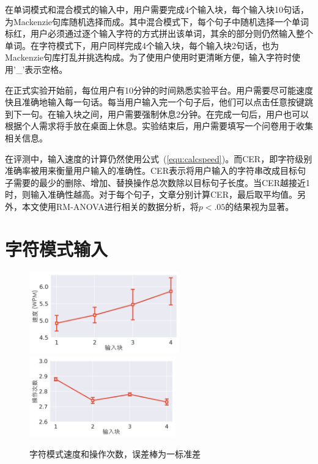 在单词模式和混合模式的输入中，用户需要完成4个输入块，每个输入块10句话，为Mackenzie句库随机选择而成\cite{mackenzie2003phrase}。其中混合模式下，每个句子中随机选择一个单词标红，用户必须通过逐个输入字符的方式拼出该单词，其余的部分则仍然输入整个单词。在字符模式下，用户同样完成4个输入块，每个输入块2句话，也为Mackenzie句库\cite{mackenzie2003phrase}打乱并挑选构成。为了使用户使用时更清晰方便，输入字符时使用'\_'表示空格。

在正式实验开始前，每位用户有10分钟的时间熟悉实验平台。用户需要尽可能速度快且准确地输入每一句话。每当用户输入完一个句子后，他们可以点击任意按键跳到下一句。在输入块之间，用户需要强制休息2分钟。在完成一句后，用户也可以根据个人需求将手放在桌面上休息。实验结束后，用户需要填写一个问卷用于收集相关信息。

在评测中，输入速度的计算仍然使用公式~(\ref{equ:calcspeed})。而CER\cite{cer}，即字符级别准确率被用来衡量用户输入的准确性。CER表示将用户输入的字符串改成目标句子需要的最少的删除、增加、替换操作总次数除以目标句子长度。当CER越接近1时，则输入准确性越高。对于每个句子，文章分别计算CER，最后取平均值。另外，本文使用RM-ANOVA进行相关的数据分析，将$p<.05$的结果视为显著。

\section{字符模式输入}

\begin{figure}[h]
  \centering%
    {\includegraphics[height=3.5cm]{figures/charspeed.png}}%
  \hspace{4em}%
      {\includegraphics[height=3.5cm]{figures/ops.png}}
  \caption{字符模式速度和操作次数，误差棒为一标准差}
  \label{fig:charres}
\end{figure}

